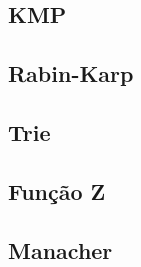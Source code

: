 \subsection{KMP}


% 

% 

\subsection{Rabin-Karp}


\subsection{Trie}


\subsection{Função Z}


% 

\subsection{Manacher}


% 

% 


